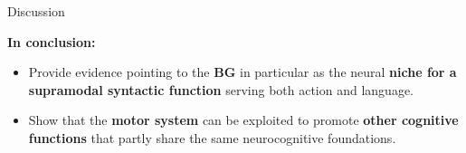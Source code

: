 \begin{frame}{Discussion}
\fontsize{12pt}{16}\selectfont

{\large \textbf{In conclusion:\\}}
\begin{itemize}
\item Provide evidence pointing to the \textbf{BG} in particular as the neural \textbf{niche for a supramodal syntactic function} serving both action and language. 
\item Show that the \textbf{motor system} can be exploited to promote \textbf{other cognitive functions} that partly share the same neurocognitive foundations.
\end{itemize}


\end{frame}